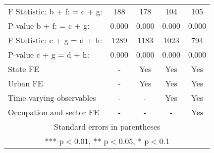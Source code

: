 \begin{tabular}{lcccc}
F Statistic: b + f: = c  + g: & 188 & 178 & 104 & 105 \\
\hspace{1mm} P-value b + f: = c + g: & 0.000 & 0.000 & 0.000 & 0.000 \\
F Statistic: c + g = d + h: & 1289 & 1183 & 1023 & 794 \\
\hspace{1mm} P-value c + g = d + h: & 0.000 & 0.000 & 0.000 & 0.000 \\
State FE & - & Yes & Yes & Yes \\
Urban FE & - & Yes & Yes & Yes \\
Time-varying observables & - & - & Yes & Yes \\
 Occupation and sector FE & - & - & - & Yes \\ \hline
\multicolumn{5}{c}{ Standard errors in parentheses} \\
\multicolumn{5}{c}{ *** p$<$0.01, ** p$<$0.05, * p$<$0.1} \\
\end{tabular}
